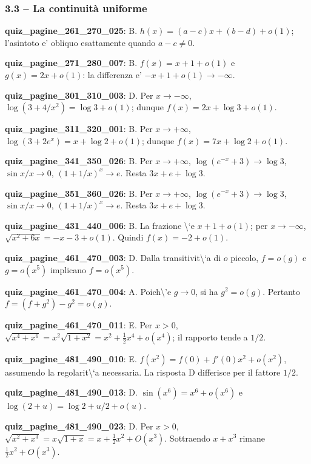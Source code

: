 \documentclass[11pt,a4paper]{article}
\newcounter{quiz}
\begin{document}
\subsubsection*{3.3 -- La continuità uniforme}
\noindent\textbf{quiz\_pagine\_261\_270\_025}: B. $h(x)=(a-c)x+(b-d)+o(1)$; l'asintoto e' obliquo esattamente quando $a-c\neq0$.\par\medskip
\noindent\textbf{quiz\_pagine\_271\_280\_007}: B. $f(x)=x+1+o(1)$ e $g(x)=2x+o(1)$: la differenza e' $-x+1+o(1)\to-\infty$.\par\medskip
\noindent\textbf{quiz\_pagine\_301\_310\_003}: D. Per $x\to-\infty$, $\log(3+4/x^2)=\log3+o(1)$; dunque $f(x)=2x+\log3+o(1)$.\par\medskip
\noindent\textbf{quiz\_pagine\_311\_320\_001}: B. Per $x\to+\infty$, $\log(3+2e^x)=x+\log2+o(1)$; dunque $f(x)=7x+\log2+o(1)$.\par\medskip
\noindent\textbf{quiz\_pagine\_341\_350\_026}: B. Per $x\to+\infty$, $\log(e^{-x}+3)\to\log3$, $\sin x/x\to0$, $(1+1/x)^x\to e$. Resta $3x+e+\log3$.\par\medskip
\noindent\textbf{quiz\_pagine\_351\_360\_026}: B. Per $x\to+\infty$, $\log(e^{-x}+3)\to\log3$, $\sin x/x\to0$, $(1+1/x)^x\to e$. Resta $3x+e+\log3$.\par\medskip
\noindent\textbf{quiz\_pagine\_431\_440\_006}: B. La frazione \textbackslash{}`e $x+1+o(1)$; per $x\to-\infty$, $\sqrt{x^2+6x}=-x-3+o(1)$. Quindi $f(x)=-2+o(1)$.\par\medskip
\noindent\textbf{quiz\_pagine\_461\_470\_003}: D. Dalla transitivit\textbackslash{}`a di $o$ piccolo, $f=o(g)$ e $g=o(x^5)$ implicano $f=o(x^5)$.\par\medskip
\noindent\textbf{quiz\_pagine\_461\_470\_004}: A. Poich\textbackslash{}'e $g\to0$, si ha $g^2=o(g)$. Pertanto $f=(f+g^2)-g^2=o(g)$.\par\medskip
\noindent\textbf{quiz\_pagine\_461\_470\_011}: E. Per $x>0$, $\sqrt{x^4+x^6}=x^2\sqrt{1+x^2}=x^2+\frac12x^4+o(x^4)$; il rapporto tende a $1/2$.\par\medskip
\noindent\textbf{quiz\_pagine\_481\_490\_010}: E. $f(x^2)=f(0)+f\prime(0)x^2+o(x^2)$, assumendo la regolarit\textbackslash{}`a necessaria. La risposta D differisce per il fattore $1/2$.\par\medskip
\noindent\textbf{quiz\_pagine\_481\_490\_013}: D. $\sin(x^6)=x^6+o(x^6)$ e $\log(2+u)=\log2+u/2+o(u)$.\par\medskip
\noindent\textbf{quiz\_pagine\_481\_490\_023}: D. Per $x>0$, $\sqrt{x^2+x^3}=x\sqrt{1+x}=x+\frac12x^2+O(x^3)$. Sottraendo $x+x^3$ rimane $\frac12x^2+O(x^3)$.\par\medskip
\end{document}
